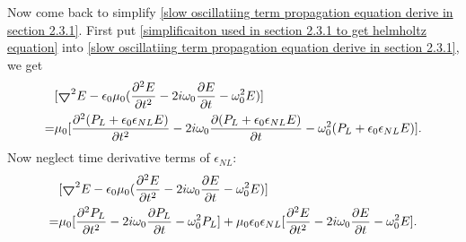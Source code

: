 \documentclass[12pt]{extarticle}
\numberwithin{equation}{section}
\numberwithin{figure}{section}
\numberwithin{table}{section}
\newcommand{\<}{\langle}
\renewcommand{\>}{\rangle}
\theoremstyle{definition}
\newcommand{\Lap}{\boldsymbol{\bigtriangledown}}
\begin{document}
\begin{itemize}
                    
                Now come back to simplify \autoref{slow oscillatiing term propagation equation derive in section 2.3.1}. First put \autoref{simplificaiton used in section 2.3.1 to get helmholtz equation} into \autoref{slow oscillatiing term propagation equation derive in section 2.3.1}, we get
                \begin{equation}
                \begin{split}
                    &[\Lap^2 E-\epsilon_0 \mu_0(\pdv[2]{E}{t}-2i\omega_0\pdv{E}{t}-\omega_0^2 E)]\\
                    =&\mu_0[\pdv[2]{(P_L+\epsilon_0 \epsilon_{NL} E)}{t}-2i\omega_0\pdv{(P_L+\epsilon_0 \epsilon_{NL} E)}{t}-\omega_0^2(P_L+\epsilon_0 \epsilon_{NL} E)].
                \end{split}
                \label{slow oscillatiing term propagation equation derive in section 2.3.1-part 2}
                \end{equation}
                Now neglect time derivative terms of $\epsilon_{NL}$:
                \begin{equation}
                \begin{split}
                    &[\Lap^2 E-\epsilon_0 \mu_0(\pdv[2]{E}{t}-2i\omega_0\pdv{E}{t}-\omega_0^2 E)]\\
                    =&\mu_0[\pdv[2]{P_L}{t}-2i\omega_0\pdv{P_L}{t}-\omega_0^2P_L]+\mu_0\epsilon_0\epsilon_{NL}[\pdv[2]{E}{t}-2i\omega_0\pdv{E}{t}-\omega_0^2 E].
                \end{split}
                \label{slow oscillatiing term propagation equation derive in section 2.3.1-part 3}
                \end{equation}
                

\end{itemize}
\end{document}
